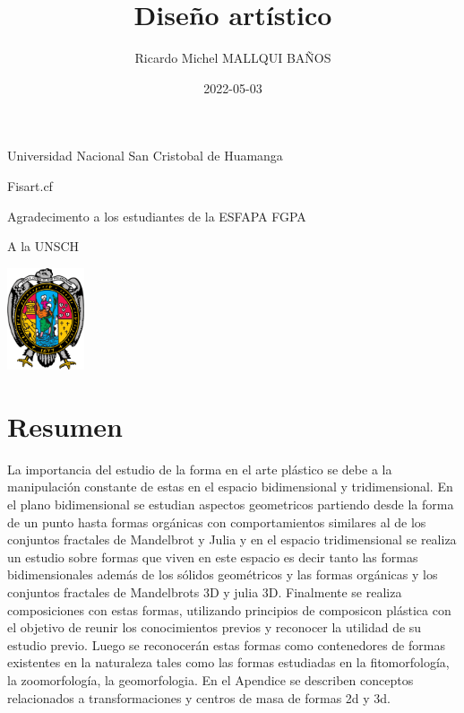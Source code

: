 \documentclass[
  16pt,
]{krantz}
\title{Diseño artístico}
\author{Ricardo Michel MALLQUI BAÑOS}
\date{2022-05-03}
\theoremstyle{definition}
\theoremstyle{definition}
\theoremstyle{definition}
\theoremstyle{definition}
\theoremstyle{remark}
\begin{document}
\maketitle

\thispagestyle{empty}
\begin{flushright}
Universidad Nacional San Cristobal de Huamanga

Fisart.cf

Agradecimento a los estudiantes de la ESFAPA FGPA

A la UNSCH

\includegraphics[height=3cm]{U.pdf}
\end{flushright}

{
\hypersetup{linkcolor=}
\setcounter{tocdepth}{2}
\tableofcontents
}
\listoftables
\listoffigures
\newcommand{\N}{\mathbb{N}}
\newcommand{\R}{\mathbb{R}}
\newcommand{\CC}{\mathbb{C}}
\newcommand{\I}{\mathbb{I}}
\newcommand{\f}{\mathbb{f}}
\newcommand{\X}{\mathbb{X}}
\newcommand{\D}{\mathbb{D}}
\newcommand{\Z}{\mathbb{Z}}
\newcommand{\Q}{\mathbb{Q}}
\newcommand{\norm}[1]{\left\Vert#1\right\Vert}
\newcommand{\abs}[1]{\left\vert#1\right\vert}
\newcommand{\set}[1]{\left\{#1\right\}}
\newcommand{\seq}[1]{\left<#1\right>}
\newcommand{\co}[1]{\left[#1\right]}
\newcommand{\cc}[1]{\left(#1\right)}
\newcommand{\J}{\mathcal{J}}
\newcommand{\K}{\mathcal{K}}
\newcommand{\M}{\mathcal{M}}
\newcommand{\F}{\mathcal{F}}

\hypertarget{resumen}{%
\chapter*{Resumen}\label{resumen}}


La importancia del estudio de la forma en el arte plástico se debe a la manipulación constante de estas en el espacio bidimensional y tridimensional. En el plano bidimensional se estudian aspectos geometricos partiendo desde la forma de un punto hasta formas orgánicas con comportamientos similares al de los conjuntos fractales de Mandelbrot y Julia y en el espacio tridimensional se realiza un estudio sobre formas que viven en este espacio es decir tanto las formas bidimensionales además de los sólidos geométricos y las formas orgánicas y los conjuntos fractales de Mandelbrots 3D y julia 3D. Finalmente se realiza composiciones con estas formas, utilizando principios de composicon plástica con el objetivo de reunir los conocimientos previos y reconocer la utilidad de su estudio previo. Luego se reconocerán estas formas como contenedores de formas existentes en la naturaleza tales como las formas estudiadas en la fitomorfología, la zoomorfología, la geomorfologia. En el Apendice se describen conceptos relacionados a transformaciones y centros de masa de formas 2d y 3d.
\end{document}
